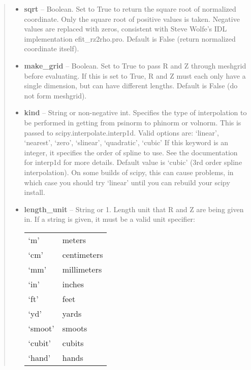 \documentclass[letterpaper,10pt,english]{sphinxmanual}
\begin{document}
\begin{fulllineitems}
\begin{fulllineitems}
\begin{quote}
\begin{description}
\begin{itemize}
\item {} 
\textbf{sqrt} -- Boolean.
Set to True to return the square root of normalized
coordinate. Only the square root of positive values is taken.
Negative values are replaced with zeros, consistent with Steve
Wolfe's IDL implementation efit\_rz2rho.pro. Default is False
(return normalized coordinate itself).

\item {} 
\textbf{make\_grid} -- Boolean.
Set to True to pass R and Z through meshgrid
before evaluating. If this is set to True, R and Z must each
only have a single dimension, but can have different lengths.
Default is False (do not form meshgrid).

\item {} 
\textbf{kind} -- String or non-negative int.
Specifies the type of interpolation to be performed in getting
from psinorm to phinorm or volnorm. This is passed to
scipy.interpolate.interp1d. Valid options are:
`linear', `nearest', `zero', `slinear', `quadratic', `cubic'
If this keyword is an integer, it specifies the order of spline
to use. See the documentation for interp1d for more details.
Default value is `cubic' (3rd order spline interpolation). On
some builds of scipy, this can cause problems, in which case
you should try `linear' until you can rebuild your scipy install.

\item {} 
\textbf{length\_unit} -- 
String or 1.
Length unit that R and Z are being given
in. If a string is given, it must be a valid unit specifier:

\begin{tabulary}{\linewidth}{|L|L|}
\hline

`m'
 & 
meters
\\

`cm'
 & 
centimeters
\\

`mm'
 & 
millimeters
\\

`in'
 & 
inches
\\

`ft'
 & 
feet
\\

`yd'
 & 
yards
\\

`smoot'
 & 
smoots
\\

`cubit'
 & 
cubits
\\

`hand'
 & 
hands
\\


\end{tabulary}
\end{itemize}
\end{description}
\end{quote}
\end{fulllineitems}
\end{fulllineitems}
\end{document}
